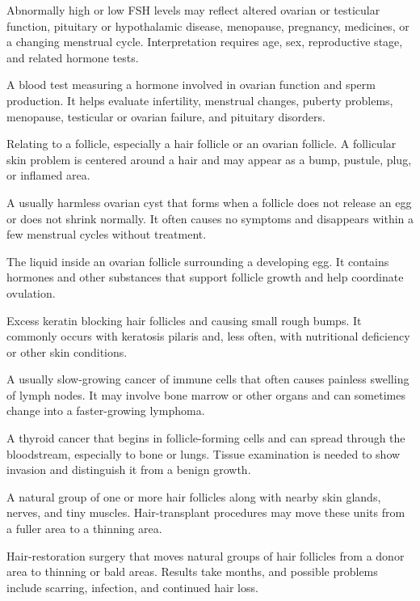  Abnormally high or low FSH levels may reflect altered ovarian or testicular function, pituitary or hypothalamic disease, menopause, pregnancy, medicines, or a changing menstrual cycle. Interpretation requires age, sex, reproductive stage, and related hormone tests.

 A blood test measuring a hormone involved in ovarian function and sperm production. It helps evaluate infertility, menstrual changes, puberty problems, menopause, testicular or ovarian failure, and pituitary disorders.

 Relating to a follicle, especially a hair follicle or an ovarian follicle. A follicular skin problem is centered around a hair and may appear as a bump, pustule, plug, or inflamed area.

 A usually harmless ovarian cyst that forms when a follicle does not release an egg or does not shrink normally. It often causes no symptoms and disappears within a few menstrual cycles without treatment.

 The liquid inside an ovarian follicle surrounding a developing egg. It contains hormones and other substances that support follicle growth and help coordinate ovulation.

 Excess keratin blocking hair follicles and causing small rough bumps. It commonly occurs with keratosis pilaris and, less often, with nutritional deficiency or other skin conditions.

 A usually slow-growing cancer of immune cells that often causes painless swelling of lymph nodes. It may involve bone marrow or other organs and can sometimes change into a faster-growing lymphoma.

 A thyroid cancer that begins in follicle-forming cells and can spread through the bloodstream, especially to bone or lungs. Tissue examination is needed to show invasion and distinguish it from a benign growth.

 A natural group of one or more hair follicles along with nearby skin glands, nerves, and tiny muscles. Hair-transplant procedures may move these units from a fuller area to a thinning area.

 Hair-restoration surgery that moves natural groups of hair follicles from a donor area to thinning or bald areas. Results take months, and possible problems include scarring, infection, and continued hair loss.

